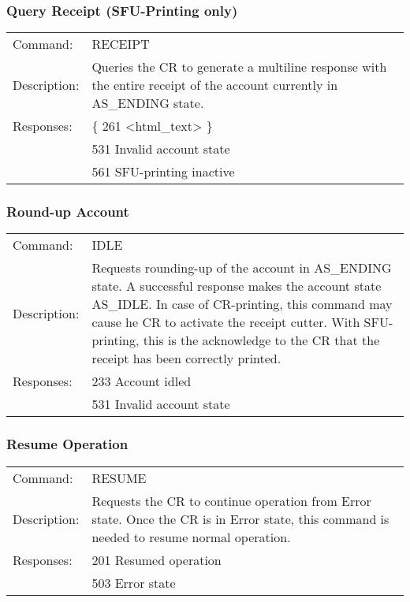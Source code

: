 \subsubsection*{Query Receipt (SFU-Printing only)}
\begin{tabular}{lp{350px}}
Command: & RECEIPT  \\
Description: & Queries the CR to generate a multiline response with the entire receipt of the account currently in AS\_ENDING state. \\
Responses: & \{ 261 <html\_text> \} \\
& 531 Invalid account state \\
& 561 SFU-printing inactive
\end{tabular}

\subsubsection*{Round-up Account}
\begin{tabular}{lp{350px}}
Command: & IDLE \\
Description: & Requests rounding-up of the account in AS\_ENDING state. A successful response makes the account state AS\_IDLE. In case of CR-printing, this command may cause he CR to activate the receipt cutter. With SFU-printing, this is the acknowledge to the CR that the receipt has been correctly printed. \\
Responses: & 233 Account idled \\
& 531 Invalid account state
\end{tabular}

\subsubsection*{Resume Operation}
\begin{tabular}{lp{350px}}
Command: & RESUME \\
Description: & Requests the CR to continue operation from Error state. Once the CR is in Error state, this command is needed to resume normal operation. \\
Responses: & 201 Resumed operation \\
& 503 Error state
\end{tabular}

